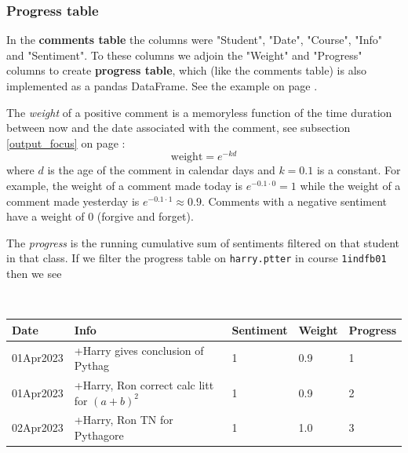 \documentclass[10pt]{article}
\begin{document}
\subsubsection{Progress table}
In the \textbf{comments table} the columns were "Student", "Date", "Course", "Info" and "Sentiment". To these columns we adjoin the "Weight" and "Progress" columns to create \textbf{progress table}, which (like the comments table) is also implemented as a pandas DataFrame. See the example on page \pageref{comments_table}.

The \emph{weight} of a positive comment is a memoryless function of the time duration between now and the date associated with the comment, see subsection \ref{output_focus} on page \pageref{output_focus}:
$$ \mathrm{weight} = e^{-kd} $$
where $d$ is the age of the comment in calendar days and $k = 0.1$ is a constant. For example, the weight of a comment made today is $e^{-0.1 \cdot 0} = 1$ while the weight of a comment made yesterday is $e^{-0.1 \cdot 1} \approx 0.9$. Comments with a negative sentiment have a weight of 0 (forgive and forget).

The \emph{progress} is the running cumulative sum of sentiments filtered on that student in that class. If we filter the progress table on \texttt{harry.ptter} in course \texttt{1indfb01} then we see

\

{\footnotesize
\hspace{-6mm}
\begin{tabular}{|l|l|l|l|l|}
\hline
\textbf{Date} & \textbf{Info}                                                               & \textbf{Sentiment} & \textbf{Weight} & \textbf{Progress} \\ \hline
01Apr2023     & +Harry gives conclusion of Pythag                                           & 1                  & 0.9             & 1                 \\ \hline
01Apr2023     & +Harry, Ron correct calc litt for $(a+b)^2$ & 1                  & 0.9             & 2                 \\ \hline
02Apr2023     & +Harry, Ron TN for Pythagore                                                & 1                  & 1.0             & 3                 \\ \hline
\end{tabular}
}
\end{document}
